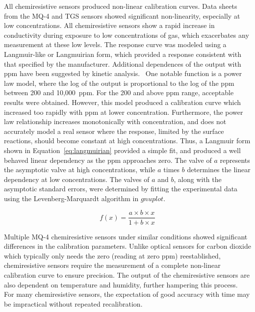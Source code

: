 \documentclass[times]{joehreview}
\begin{document}
	All chemiresistive sensors produced non-linear calibration curves.  Data sheets from the MQ-4 and TGS sensors showed significant non-linearity, especially at low concentrations.  All chemiresistive sensors show a rapid increase in conductivity during exposure to low concentrations of gas, which exacerbates any measurement  at these low levels.  The response curve was modeled using a Langmuir-like or Langmuirian form, which provided a response consistent with that specified by the manufacturer.  Additional dependences of the output with ppm have been suggested by kinetic analysis.~\cite{barsan_fundamental_1999,ahlers_rate_2005}  One notable function is a power law model, where the log of the output is proportional to the log of the ppm between 200 and 10,000~ppm.  For the 200 and above ppm range, acceptable results were obtained.  However, this model produced a calibration curve which increased too rapidly with ppm at lower concentration.  Furthermore, the power law relationship increases monotonically with concentration, and does not accurately model a real sensor where the response, limited by the surface reactions, should become constant at high concentrations.  Thus, a Langmuir form shown in Equation~\ref{eq:langmuirian} provided a simple fit, and produced a well behaved linear dependency as the ppm approaches zero.  The valve of $a$ represents the asymptotic valve at high concentrations, while $a$ times $b$ determines the linear dependency at low concentrations.  The valves of $a$ and $b$, along with the asymptotic standard errors, were determined by fitting the experimental data using the Levenberg-Marquardt algorithm in $gnuplot$.~\cite{williams_gnuplot_2016}
	
	\begin{equation}
	\label{eq:langmuirian}
	f(x)=\frac{a\times b\times x}{1+b\times x}
	\end{equation}
	
	Multiple MQ-4 chemiresistive sensors under similar conditions showed significant differences in the calibration parameters.  Unlike optical sensors for carbon dioxide which typically only needs the zero (reading at zero ppm) reestablished, chemiresistive sensors require the measurement of a complete non-linear calibration curve to ensure precision.  The output of the chemiresistive sensors are also dependent on temperature and humidity, further hampering this process.~\cite{benkstein_analytical_2014}  For many chemiresistive sensors, the expectation of good accuracy with time may be impractical without repeated recalibration.
	
\end{document}
